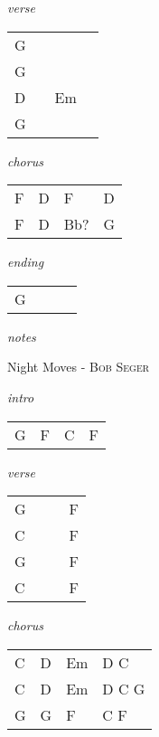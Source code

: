 \documentclass[12pt]{article}
\begin{document}
\textit{verse}

\begin{tabular}{|P{1.25in}|P{1.25in}|P{1.25in}|P{1.25in}|}
  G &   &   &   \\
  G &   &   &   \\
  D &   & Em  &   \\
  G &   &   &   \\
\end{tabular}

\textit{chorus}

\begin{tabular}{|P{1.25in}|P{1.25in}|P{1.25in}|P{1.25in}|}
  F & D  & F  &  D \\
  F & D & Bb? & G  \\
\end{tabular}

\textit{ending}

\begin{tabular}{|P{1.25in}|P{1.25in}|P{1.25in}|P{1.25in}|}
  G &   &   &   \\
\end{tabular}

\textit{notes}

\newpage

{\Huge Night Moves} {\huge - \textsc{Bob Seger}}

\huge
\textit{intro}

\begin{tabular}{|P{1.25in}|P{1.25in}|P{1.25in}|P{1.25in}|}
  G & F & C & F \\
\end{tabular}

\textit{verse}

\begin{tabular}{|P{1.25in}|P{1.25in}|P{1.25in}|P{1.25in}|}
  G &   &   &  F \\
  C &   &   &  F \\
  G &   &   &  F \\
  C &   &   &  F \\
\end{tabular}

\textit{chorus}

\begin{tabular}{|P{1.25in}|P{1.25in}|P{1.25in}|P{1.25in}|}
  C & D  & Em  &  D C \\
  C & D  & Em  &  D C G \\
  G & G & F & C F \\
\end{tabular}
\end{document}
